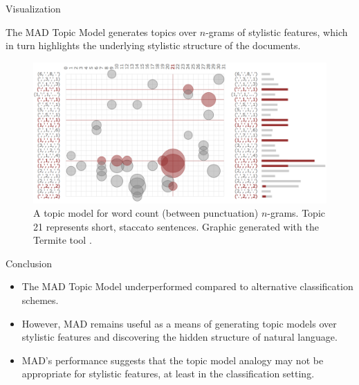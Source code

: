 \documentclass[final]{beamer}
\newlength{\onecolwid}
\begin{document}
\begin{frame}[t]
\begin{columns}[t]
\begin{column}{\onecolwid}
\begin{block}{Visualization}

The MAD Topic Model generates topics over $n$-grams of stylistic features, which in turn highlights the underlying stylistic structure of the documents.

\vspace{5mm}
\begin{figure}
\centering
\includegraphics[width=\linewidth]{termite.png}
\caption{A topic model for word count (between punctuation) $n$-grams. Topic 21 represents short, staccato sentences. Graphic generated with the Termite tool \citep{termite}.}
\end{figure}
\end{block}

\vspace{-5mm}


\begin{block}{Conclusion}

\begin{itemize}
\item The MAD Topic Model underperformed compared to alternative classification schemes.
\item However, MAD remains useful as a means of generating topic models over stylistic features and discovering the hidden structure of natural language.
\item MAD's performance suggests that the topic model analogy may not be appropriate for stylistic features, at least in the classification setting.
\end{itemize}

\end{block}


\end{column}
\end{columns}
\end{frame}
\end{document}

